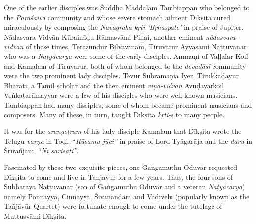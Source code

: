 One of the earlier disciples was Śuddha Maddaḷam Tambiappan who belonged to the \textit{Paraśaiva} community and whose severe stomach ailment Dīkṣita cured miraculously by composing the \textit{Navagraha kṛti ‘Bṛhaspate’} in praise of Jupiter. Nādasvara Vidvān Kūraināḍu Rāmasvāmi Piḷḷai, another eminent \textit{nādasvara-vidvān} of those times, Terazundūr Bilvavanam, Tiruvārūr Ayyāsāmi Naṭṭuvanār who was a \textit{Nāṭyācārya} were some of the early disciples. Ammaṇi of Vaḷḷalar Koil and Kamalam of Tiruvarur, both of whom belonged to the \textit{devadāsī} community were the two prominent lady disciples. Tevur Subramaṇia Iyer, Tirukkaḍayur Bhārati, a Tamil scholar and the then eminent \textit{vīṇā-vidvān} Avuḍayarkoil Veṅkaṭarāmayyar were a few of his disciples who were well-known musicians. Tambiappan had many disciples, some of whom became prominent musicians and composers. Many of these, in turn, taught Dīkṣita \textit{kṛti-s} to many people.

It was for the \textit{arangeṭram} of his lady disciple Kamalam that Dīkṣita wrote the Telugu \textit{varṇa} in Toḍi, “\textit{Rūpamu jūci”} in praise of Lord Tyāgarāja and the \textit{daru} in Śrīrañjanī, “\textit{Nī sarisāṭi”}.

Fascinated by these two exquisite pieces, one Gaṅgamuthu Oduvār requested Dīkṣita to come and live in Tanjavur for a few years. Thus, the four sons of Subbarāya Naṭṭuvanār (son of Gaṅgamuthu Oduvār and a veteran \textit{Nāṭyācārya}) namely Ponnayyā, Cinnayyā, Śivānandam and Vaḍivelu (popularly known as the Tañjāvūr Quartet) were fortunate enough to come under the tutelage of Muttusvāmi Dīkṣita.

